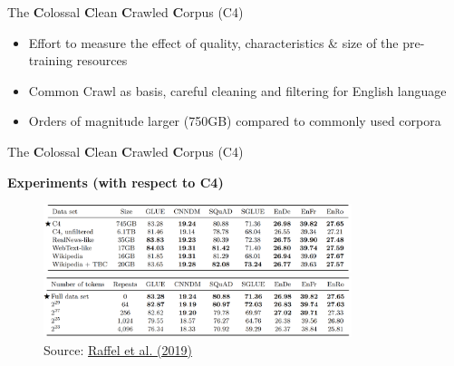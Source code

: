 
\begin{frame}{The \textbf{C}olossal \textbf{C}lean \textbf{C}rawled \textbf{C}orpus (C4)}

\vfill

	\begin{itemize}
		\item Effort to measure the effect of quality, characteristics \& size of the pre-training resources
		\item Common Crawl as basis, careful cleaning and filtering for English language
		\item Orders of magnitude larger (750GB) compared to commonly used corpora 
	\end{itemize}
	
\vfill

\end{frame}


\begin{frame}{The \textbf{C}olossal \textbf{C}lean \textbf{C}rawled \textbf{C}orpus (C4)}

\vfill
	
	\textbf{Experiments (with respect to C4)}
	
	\begin{figure}
		\centering
		\includegraphics[width = 9cm]{figure/63-c4-characteristics.png}\\ 
		\includegraphics[width = 9cm]{figure/63-c4-size.png}\\ 
		\footnotesize{Source:} \href{https://arxiv.org/pdf/1910.10683.pdf}{\footnotesize Raffel et al. (2019)}
	\end{figure}
	
\vfill

\end{frame}


